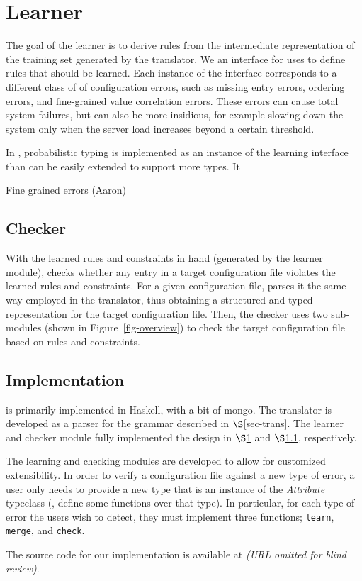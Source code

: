 \section{Learner}
\label{sec-learn}


The goal of the learner is to derive rules from the intermediate representation of the training set generated by the translator.
We an interface for uses to define rules that should be learned.
Each instance of the interface corresponds to a different class of of configuration errors, such as missing entry errors, ordering errors, and fine-grained value correlation errors. 
These errors can cause total system failures, but can also be more insidious, for example slowing down the system only when the server load increases beyond a certain threshold.


In \app, probabilistic typing is implemented as an instance of the learning interface than can be easily extended to support more types. 
It 



Fine grained errors (Aaron)

\subsection{Checker}
\label{sec-checker}

With the learned rules and constraints in hand (generated
by the learner module),
\app checks whether any entry in a target configuration file
violates the learned rules and constraints.
For a given configuration file, \app parses it the same
way employed in the translator, thus obtaining a structured
and typed representation for the target configuration file.
Then, the checker uses two sub-modules (shown in 
Figure~\ref{fig-overview}) to check the target
configuration file based on rules and constraints.

\subsection{Implementation}

\app is primarily implemented in Haskell, with a bit of mongo.
The translator is developed as a parser for the grammar described in $\S$\ref{sec-trans}. 
The learner and checker module fully implemented the design in $\S$\ref{sec-learn} and $\S$\ref{sec-checker}, respectively. 
 
The learning and checking modules are developed to allow
for customized extensibility. In order to verify a configuration file
against a new type of error, a user only needs to provide a new type
that is an instance of the \textit{Attribute} typeclass (\ie, define some
functions over that type). 
In particular, for each type of error the users
wish to detect, they must implement three functions;
\lstinline{learn}, \lstinline{merge}, and \lstinline{check}.

The source code for our implementation is available at {\em (URL omitted for blind review)}.
